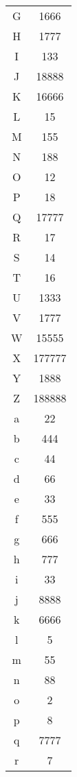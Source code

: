 \documentclass{article}
\begin{document}
\begin{multicols}{2}
\begin{supertabular}{|c|c|}
        G & 1666 \\
        H & 1777 \\
        I & 133 \\
        J & 18888 \\
        K & 16666 \\
        L & 15 \\
        M & 155 \\
        N & 188 \\
        O & 12 \\
        P & 18 \\
        Q & 17777 \\
        R & 17 \\
        S & 14 \\
        T & 16 \\
        U & 1333 \\
        V & 1777 \\
        W & 15555 \\
        X & 177777 \\
        Y & 1888 \\
        Z & 188888 \\
        a & 22 \\
        b & 444 \\
        c & 44 \\
        d & 66 \\
        e & 33 \\
        f & 555 \\
        g & 666 \\
        h & 777 \\
        i & 33 \\
        j & 8888 \\
        k & 6666 \\
        l & 5 \\
        m & 55 \\
        n & 88 \\
        o & 2 \\
        p & 8 \\
        q & 7777 \\
        r & 7 \\

\end{supertabular}
\end{multicols}
\end{document}

